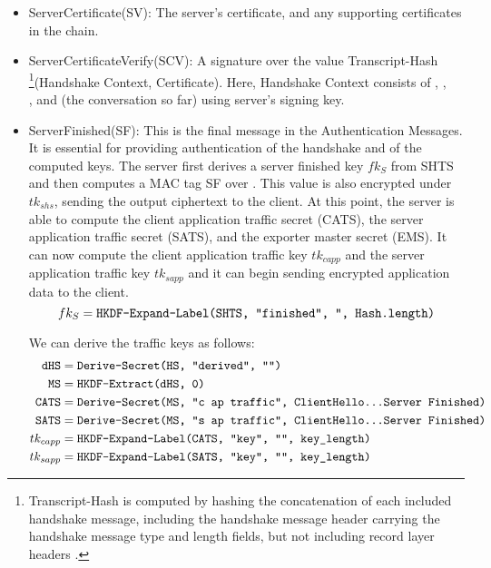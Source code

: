 \begin{itemize}
  \item ServerCertificate(SV): The server's certificate, and any supporting certificates in the chain.
  
  \item ServerCertificateVerify(SCV): A signature over the value  Transcript-Hash \footnote{Transcript-Hash is computed by hashing the concatenation of each included handshake message, including the handshake message header carrying the handshake message type and length fields, but not including record layer headers \cite{rfc8446}.}(Handshake Context, Certificate). Here, Handshake Context consists of , ,\\ , and  (the conversation so far) using server's signing key. 

 \item ServerFinished(SF): This is the final message in the Authentication Messages. It is essential for providing authentication of the handshake and of the computed keys. The server first derives a server finished key $fk_S$ from SHTS and then computes a MAC tag SF over . This value is also encrypted under $tk_{shs}$, sending the output ciphertext to the client. At this point, the server is able to compute the client application traffic secret (CATS), the server application traffic secret (SATS), and the exporter master secret (EMS).  It can now compute the client application traffic key $tk_{capp}$ and the server application traffic key $tk_{sapp}$ and it can begin sending encrypted application data to the client.
 \begin{equation}
  fk_S = \texttt{HKDF-Expand-Label(SHTS, ``finished'', '', Hash.length)}
 \end{equation}

 We can derive the traffic keys as follows:
  \begin{equation}
    \label{eq:traffic_keys}
    \begin{split}
      \texttt{dHS} &= \texttt{Derive-Secret(HS, "derived", "")} \\
      \texttt{MS} &= \texttt{HKDF-Extract(dHS, 0)} \\
      \texttt{CATS} &= \texttt{Derive-Secret(MS, "c ap traffic", ClientHello...Server Finished)} \\
      \texttt{SATS} &= \texttt{Derive-Secret(MS, "s ap traffic", ClientHello...Server Finished)} \\
      tk_{capp} &= \texttt{HKDF-Expand-Label(CATS, "key", "", key\_length)} \\
      tk_{sapp} &= \texttt{HKDF-Expand-Label(SATS, "key", "", key\_length)} 
    \end{split}
  \end{equation}
  \end{itemize}

